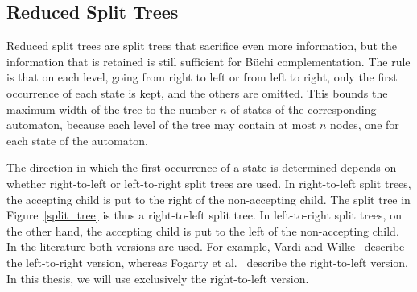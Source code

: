 


\subsection{Reduced Split Trees}
\label{2_red_split_trees}
Reduced split trees are split trees that sacrifice even more information, but the information that is retained is still sufficient for Büchi complementation. The rule is that on each level, going from right to left or from left to right, only the first occurrence of each state is kept, and the others are omitted. This bounds the maximum width of the tree to the number $n$ of states of the corresponding automaton, because each level of the tree may contain at most $n$ nodes, one for each state of the automaton.

The direction in which the first occurrence of a state is determined depends on whether right-to-left or left-to-right split trees are used. In right-to-left split trees, the accepting child is put to the right of the non-accepting child. The split tree in Figure~\ref{split_tree} is thus a right-to-left split tree. In left-to-right split trees, on the other hand, the accepting child is put to the left of the non-accepting child. In the literature both versions are used. For example, Vardi and Wilke~\cite{vardi2007automata} describe the left-to-right version, whereas Fogarty et al.~\cite{fogarty2013unifying} describe the right-to-left version. In this thesis, we will use exclusively the right-to-left version.

